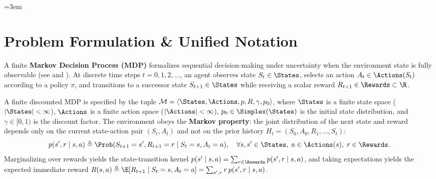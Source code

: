 \documentclass[../../../../master.tex]{subfiles}
\begin{document}
\sloppy\emergencystretch=3em

\section{Problem Formulation \& Unified Notation}\label{sec:mdp:formulation}

A finite \textbf{Markov Decision Process (MDP)} formalizes sequential decision-making under uncertainty when the environment state is fully observable (see  and ). At discrete time steps $t = 0, 1, 2, \dots$, an agent observes state $S_t \in \States$, selects an action $A_t \in \Actions(S_t)$ according to a policy $\pi$, and transitions to a successor state $S_{t+1} \in \States$ while receiving a scalar reward $R_{t+1} \in \Rewards \subset \R$.

\begin{coremath}
A finite discounted MDP is specified by the tuple $\mathcal{M} = \langle \States, \Actions, p, R, \gamma, p_0 \rangle$, where $\States$ is a finite state space ($|\States| < \infty$), $\Actions$ is a finite action space ($|\Actions| < \infty$), $p_0 \in \Simplex(\States)$ is the initial state distribution, and $\gamma \in [0, 1)$ is the discount factor. The environment obeys the \textbf{Markov property}: the joint distribution of the next state and reward depends only on the current state-action pair $(S_t, A_t)$ and not on the prior history $H_t = (S_0, A_0, R_1, \dots, S_t)$:
\begin{equation}\label{eq:mdp:dynamics}
  p(s', r \mid s, a) \triangleq \Prob(S_{t+1} = s', R_{t+1} = r \mid S_t = s, A_t = a), \quad \forall s, s' \in \States,\; a \in \Actions(s),\; r \in \Rewards.
\end{equation}
Marginalizing over rewards yields the state-transition kernel $p(s' \mid s, a) = \sum_{r \in \Rewards} p(s', r \mid s, a)$, and taking expectations yields the expected immediate reward $R(s, a) \triangleq \E[R_{t+1} \mid S_t = s, A_t = a] = \sum_{s', r} r\, p(s', r \mid s, a)$.
\end{coremath}
\end{document}

